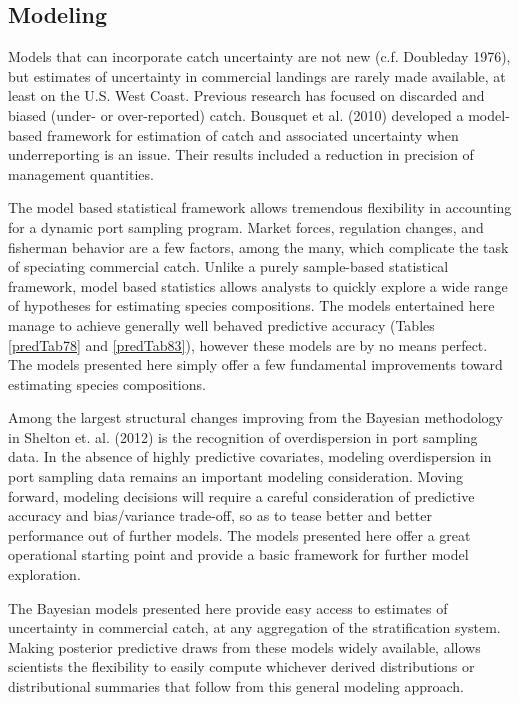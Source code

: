 \documentclass[12pt]{article}
\begin{document}
\subsection{Modeling}\label{modeling}

Models that can incorporate catch uncertainty are not new (c.f.
Doubleday 1976), but estimates of uncertainty in commercial landings are
rarely made available, at least on the U.S. West Coast. Previous
research has focused on discarded and biased (under- or over-reported)
catch. Bousquet et al. (2010) developed a model-based framework for
estimation of catch and associated uncertainty when underreporting is an
issue. Their results included a reduction in precision of management
quantities.

The model based statistical framework allows tremendous flexibility in
accounting for a dynamic port sampling program. Market forces,
regulation changes, and fisherman behavior are a few factors, among the
many, which complicate the task of speciating commercial catch. Unlike a
purely sample-based statistical framework, model based statistics allows
analysts to quickly explore a wide range of hypotheses for estimating
species compositions. The models entertained here manage to achieve
generally well behaved predictive accuracy (Tables \ref{predTab78} and 
\ref{predTab83}), however these models are by no means perfect. The models 
presented here simply offer a few fundamental improvements toward estimating 
species compositions.

Among the largest structural changes improving from the Bayesian
methodology in Shelton et. al. (2012) is the recognition of
overdispersion in port sampling data. In the absence of highly
predictive covariates, modeling overdispersion in port sampling data
remains an important modeling consideration. Moving forward, modeling
decisions will require a careful consideration of predictive accuracy
and bias/variance trade-off, so as to tease better and better
performance out of further models. The models presented here offer a
great operational starting point and provide a basic framework for
further model exploration.

The Bayesian models presented here provide easy access to estimates of
uncertainty in commercial catch, at any aggregation of the
stratification system. Making posterior predictive draws from these
models widely available, allows scientists the flexibility to easily
compute whichever derived distributions or distributional summaries that
follow from this general modeling approach.
\end{document}
